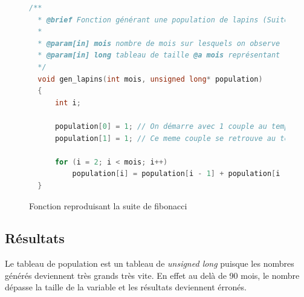 \documentclass{article}
\begin{document}
\begin{figure}[!ht]
\caption{Fonction reproduisant la suite de fibonacci}
\begin{lstlisting}[language=c++]
  /**
  * @brief Fonction générant une population de lapins (Suite de Fibonacci)
  * 
  * @param[in] mois nombre de mois sur lesquels on observe l'évolution de la population de lapins
  * @param[in] long tableau de taille @a mois représentant le nombre de lapins chaque mois
  */
  void gen_lapins(int mois, unsigned long* population)
  {
      int i;
  
      population[0] = 1; // On démarre avec 1 couple au temps 0
      population[1] = 1; // Ce meme couple se retrouve au temps 1
  
      for (i = 2; i < mois; i++)
          population[i] = population[i - 1] + population[i - 2];
  }
\end{lstlisting}
\end{figure}

\subsection{Résultats}
Le tableau de population est un tableau de \emph{unsigned long} puisque les
nombres générés deviennent très grands très vite. En effet au delà de 90 mois, 
le nombre dépasse la taille de la variable et les résultats deviennent érronés.
\end{document}
